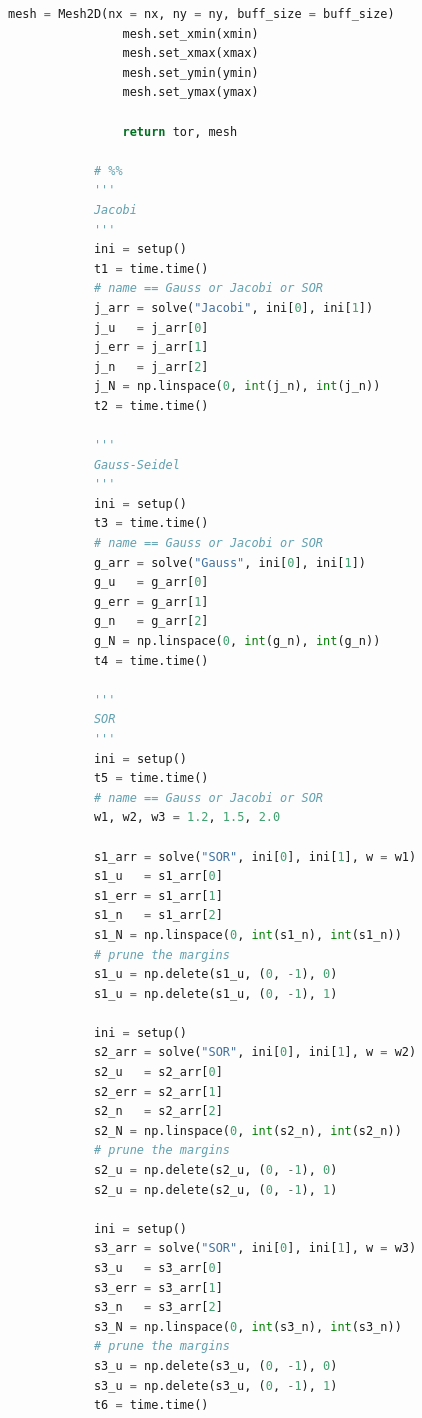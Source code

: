 \documentclass[12pt]{article}
\begin{document}
\begin{lstlisting}[language={Python}]
                mesh = Mesh2D(nx = nx, ny = ny, buff_size = buff_size)
                mesh.set_xmin(xmin)
                mesh.set_xmax(xmax)
                mesh.set_ymin(ymin)
                mesh.set_ymax(ymax)
            
                return tor, mesh
            
            # %%
            '''
            Jacobi
            '''
            ini = setup()
            t1 = time.time()
            # name == Gauss or Jacobi or SOR
            j_arr = solve("Jacobi", ini[0], ini[1])
            j_u   = j_arr[0]
            j_err = j_arr[1]
            j_n   = j_arr[2]
            j_N = np.linspace(0, int(j_n), int(j_n))
            t2 = time.time()
            
            '''
            Gauss-Seidel
            '''
            ini = setup()
            t3 = time.time()
            # name == Gauss or Jacobi or SOR
            g_arr = solve("Gauss", ini[0], ini[1])
            g_u   = g_arr[0]
            g_err = g_arr[1]
            g_n   = g_arr[2]
            g_N = np.linspace(0, int(g_n), int(g_n))
            t4 = time.time()
            
            '''
            SOR
            '''
            ini = setup()
            t5 = time.time()
            # name == Gauss or Jacobi or SOR
            w1, w2, w3 = 1.2, 1.5, 2.0
            
            s1_arr = solve("SOR", ini[0], ini[1], w = w1)
            s1_u   = s1_arr[0]
            s1_err = s1_arr[1]
            s1_n   = s1_arr[2]
            s1_N = np.linspace(0, int(s1_n), int(s1_n))
            # prune the margins
            s1_u = np.delete(s1_u, (0, -1), 0)
            s1_u = np.delete(s1_u, (0, -1), 1)
            
            ini = setup()
            s2_arr = solve("SOR", ini[0], ini[1], w = w2)
            s2_u   = s2_arr[0]
            s2_err = s2_arr[1]
            s2_n   = s2_arr[2]
            s2_N = np.linspace(0, int(s2_n), int(s2_n))
            # prune the margins
            s2_u = np.delete(s2_u, (0, -1), 0)
            s2_u = np.delete(s2_u, (0, -1), 1)
            
            ini = setup()
            s3_arr = solve("SOR", ini[0], ini[1], w = w3)
            s3_u   = s3_arr[0]
            s3_err = s3_arr[1]
            s3_n   = s3_arr[2]
            s3_N = np.linspace(0, int(s3_n), int(s3_n))
            # prune the margins
            s3_u = np.delete(s3_u, (0, -1), 0)
            s3_u = np.delete(s3_u, (0, -1), 1)
            t6 = time.time()
            

\end{lstlisting}
\end{document}
